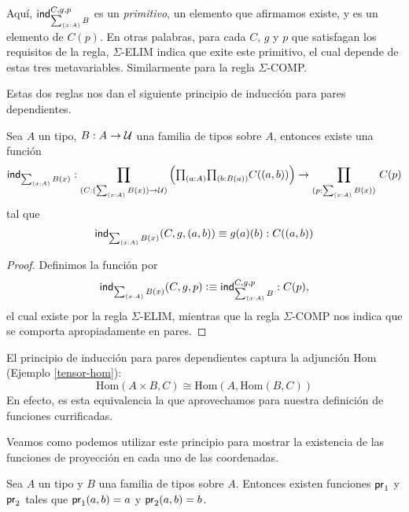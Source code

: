 \documentclass[../main.tex]{subfiles}
\begin{document}
Aqu\'i, $\ind{\tsm{x:A}B}^{C,g,p}$ es un \textit{primitivo}, un elemento que afirmamos existe, y es un elemento de $C(p)$.
En otras palabras, para cada $C$, $g$ y $p$ que satisfagan los requisitos de la regla, $\Sigma$-ELIM indica que exite este primitivo, el cual depende de estas tres metavariables.
Similarmente para la regla $\Sigma$-COMP.

Estas dos reglas nos dan el siguiente principio de inducción para pares dependientes.

\begin{theorem}
    Sea $A$ un tipo, $B:A \to \mathcal{U}$ una familia de tipos sobre $A$, entonces existe una función
    \[
        \ind{\sm{x:A}B(x)} :
        \dprd{C:(\sm{x:A} B(x)) \to \UU}
        \Parens{\tprd{a:A}{b:B(a)} C(\tup{a}{b})}
        \to \dprd{p : \sm{x:A}B(x)} C(p)
    \]
    tal que
    $$\ind{\tsm{x:A}B(x)} (C,g,(a,b))\jdeq g(a)(b) : C((a,b))$$
\end{theorem}

\begin{proof}
    Definimos la funci\'on por
    \[ \ind{\sm{x:A}B(x)}(C,g,p) \defeq \ind{\tsm{x:A}B}^{C,g,p} : C(p), \]
    el cual existe por la regla $\Sigma$-ELIM, mientras que la regla $\Sigma$-COMP nos indica que se comporta apropiadamente en pares.
\end{proof}

El principio de inducción para pares dependientes captura la adjunci\'on Hom (Ejemplo \ref{tensor-hom}):
$$ \text{Hom}(A \times B, C) \cong \text{Hom}(A,\text{Hom}(B,C))$$
En efecto, es esta equivalencia la que aprovechamos para nuestra definición de funciones currificadas.

Veamos como podemos utilizar este principio para mostrar la existencia de las funciones de proyección en cada uno de las coordenadas.

\begin{theorem}
    Sea $A$ un tipo y $B$ una familia de tipos sobre $A$. Entonces existen funciones $\mathsf{pr}_{1}$ y $\mathsf{pr}_{2}$ tales que $\mathsf{pr}_{1}(a,b)=a$ y $\mathsf{pr}_{2}(a,b)=b$.
\end{theorem}
\end{document}
